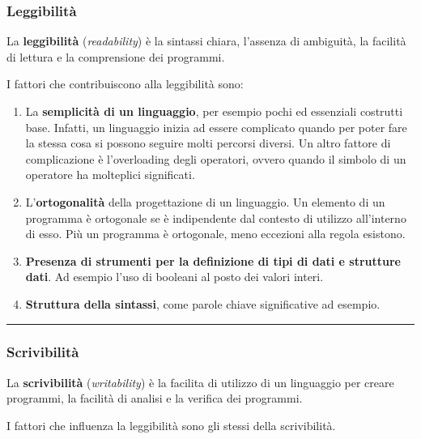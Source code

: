 \documentclass[a4paper]{article}
\newcommand{\longline}{\noindent\rule{\textwidth}{0.4pt}}
\begin{document}
	\subsubsection{Leggibilità}
	
	\begin{boxdef}
		La \textcolor{Red3}{\textbf{leggibilità}} (\emph{readability}) è la sintassi chiara, l'assenza di ambiguità, la facilità di lettura e la comprensione dei programmi.
	\end{boxdef}
	
	\noindent
	I fattori che contribuiscono alla leggibilità sono:
	\begin{enumerate}
		\item La \textbf{semplicità di un linguaggio}, per esempio pochi ed essenziali costrutti base. Infatti, un linguaggio inizia ad essere complicato quando per poter fare la stessa cosa si possono seguire molti percorsi diversi. Un altro fattore di complicazione è l'overloading degli operatori, ovvero quando il simbolo di un operatore ha molteplici significati.
		
		\item L'\textbf{ortogonalità} della progettazione di un linguaggio. Un elemento di un programma è ortogonale se è indipendente dal contesto di utilizzo all'interno di esso. Più un programma è ortogonale, meno eccezioni alla regola esistono.
		
		\item \textbf{Presenza di strumenti per la definizione di tipi di dati e strutture dati}. Ad esempio l'uso di booleani al posto dei valori interi.
		
		\item \textbf{Struttura della sintassi}, come parole chiave significative ad esempio.
	\end{enumerate}

	\longline
	
	\subsubsection{Scrivibilità}
	
	\begin{boxdef}
		La \textcolor{Red3}{\textbf{scrivibilità}} (\emph{writability}) è la facilita di utilizzo di un linguaggio per creare programmi, la facilità di analisi e la verifica dei programmi.
	\end{boxdef}
	
	\noindent
	I fattori che influenza la leggibilità sono gli stessi della scrivibilità.\newline
	
\end{document}
